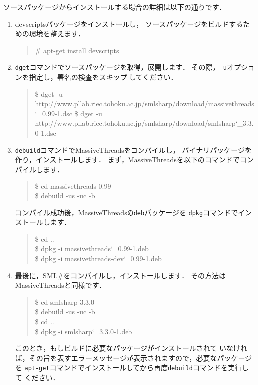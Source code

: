 \documentclass{jbook}
\newcommand{\smlsharp}{SML\#}
\newcommand{\version}{3.3.0}
\newenvironment{program}{\begin{quote}\begin{tt}}%
                        {\end{tt}\end{quote}}
\begin{document}
	ソースパッケージからインストールする場合の詳細は以下の通りです．
\begin{enumerate}
\item
	devscriptsパッケージをインストールし，
ソースパッケージをビルドするための環境を整えます．
\begin{program}
\# apt-get install devscripts
\end{program}
\item
	{\tt dget}コマンドでソースパッケージを取得，展開します．
	その際，{\tt -u}オプションを指定し，署名の検査をスキップ
してください．
\begin{program}
\$ dget -u http://www.pllab.riec.tohoku.ac.jp/smlsharp/download/massivethreads\char`\_0.99-1.dsc
\$ dget -u http://www.pllab.riec.tohoku.ac.jp/smlsharp/download/smlsharp\char`\_\version-1.dsc
\end{program}
\item
	{\tt debuild}コマンドでMassiveThreadsをコンパイルし，
バイナリパッケージを作り，インストールします．
	まず，MassiveThreadsを以下のコマンドでコンパイルします．
\begin{program}
\$ cd massivethreads-0.99\\
\$ debuild -us -uc -b
\end{program}
	コンパイル成功後，MassiveThreadsの{\tt deb}パッケージを
{\tt dpkg}コマンドでインストールします．
\begin{program}
\$ cd ..\\
\$ dpkg -i massivethreads\char`\_0.99-1.deb\\
\$ dpkg -i massivethreads-dev\char`\_0.99-1.deb
\end{program}

\item
	最後に，\smlsharp{}をコンパイルし，インストールします．
        その方法はMassiveThreadsと同様です．
\begin{program}
\$ cd smlsharp-\version\\
\$ debuild -us -uc -b\\
\$ cd ..\\
\$ dpkg -i smlsharp\char`\_\version-1.deb
\end{program}
	このとき，もしビルドに必要なパッケージがインストールされて
いなければ，その旨を表すエラーメッセージが表示されますので，必要なパッケージを
{\tt apt-get}コマンドでインストールしてから再度{\tt debuild}コマンドを実行して
ください．

\begin{program}
\end{program}
\end{enumerate}
\end{document}
